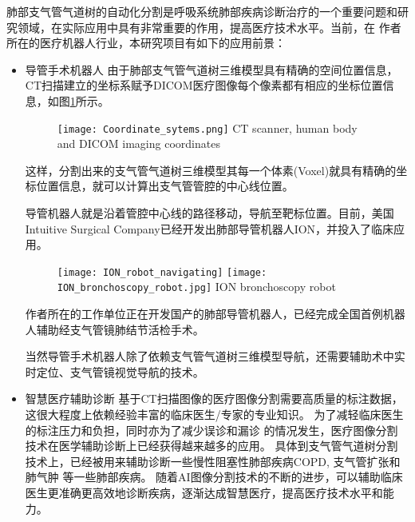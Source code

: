 肺部支气管气道树的自动化分割是呼吸系统肺部疾病诊断治疗的一个重要问题和研究领域，在实际应用中具有非常重要的作用，提高医疗技术水平。当前，在
作者所在的医疗机器人行业，本研究项目有如下的应用前景：
\begin{itemize}
	\item {\heiti 导管手术机器人 }
	由于肺部支气管气道树三维模型具有精确的空间位置信息，CT扫描建立的坐标系赋予DICOM医疗图像每个像素都有相应的坐标位置信息，如图\ref{fig:coordinate}所示。
	\begin{figure}[!htp]
		\centering
		\texttt{[image: Coordinate\_sytems.png]}
			{CT scanner, human body and DICOM imaging coordinates}
		\label{fig:coordinate}
	\end{figure}
	这样，分割出来的支气管气道树三维模型其每一个体素(Voxel)就具有精确的坐标位置信息，就可以计算出支气管管腔的中心线位置。
	
	导管机器人就是沿着管腔中心线的路径移动，导航至靶标位置。目前，美国Intuitive Surgical Company已经开发出肺部导管机器人ION，并投入了临床应用。
	\begin{figure}[!htp]
		\centering
		\texttt{[image: ION\_robot\_navigating]}
		\hspace{2mm}
		\texttt{[image: ION\_bronchoscopy\_robot.jpg]}
			{ION bronchoscopy robot}
		\label{fig:ION_robot}
	\end{figure}
	
	作者所在的工作单位正在开发国产的肺部导管机器人，已经完成全国首例机器人辅助经支气管镜肺结节活检手术。
	
	当然导管手术机器人除了依赖支气管气道树三维模型导航，还需要辅助术中实时定位、支气管镜视觉导航的技术。
	
	
	\item {\heiti 智慧医疗辅助诊断}
	基于CT扫描图像的医疗图像分割需要高质量的标注数据，这很大程度上依赖经验丰富的临床医生/专家的专业知识。 为了减轻临床医生的标注压力和负担，同时亦为了减少误诊和漏诊
	的情况发生，医疗图像分割技术在医学辅助诊断上已经获得越来越多的应用。 具体到支气管气道树分割技术上，已经被用来辅助诊断一些慢性阻塞性肺部疾病COPD, 支气管扩张和肺气肿
	等一些肺部疾病。 随着AI图像分割技术的不断的进步，可以辅助临床医生更准确更高效地诊断疾病，逐渐达成智慧医疗，提高医疗技术水平和能力。
\end{itemize}




